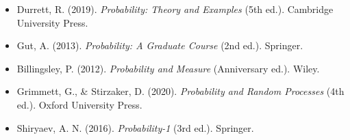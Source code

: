 \documentclass[12pt,a4paper]{article}
\theoremstyle{plain}
\theoremstyle{definition}
\begin{document}
\begin{itemize}
\item Durrett, R. (2019). \textit{Probability: Theory and Examples} (5th ed.). Cambridge University Press.
\item Gut, A. (2013). \textit{Probability: A Graduate Course} (2nd ed.). Springer.
\item Billingsley, P. (2012). \textit{Probability and Measure} (Anniversary ed.). Wiley.
\item Grimmett, G., \& Stirzaker, D. (2020). \textit{Probability and Random Processes} (4th ed.). Oxford University Press.
\item Shiryaev, A. N. (2016). \textit{Probability-1} (3rd ed.). Springer.
\end{itemize}
\end{document}

